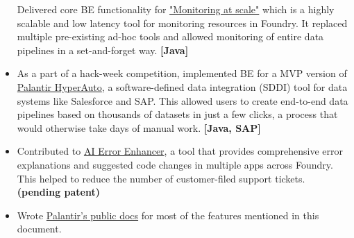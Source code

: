 \begin{itemize}
{        Delivered core BE functionality for
        \href{https://www.palantir.com/docs/foundry/maintaining-pipelines/monitoring-views-intro/}{"Monitoring at scale"}
        which is a highly scalable and low latency tool for monitoring resources in Foundry.
        It replaced multiple pre-existing ad-hoc tools and allowed monitoring of entire data pipelines in a set-and-forget way.
    }
    \textbf{[Java]}
    \item {
        As a part of a hack-week competition, implemented BE for a MVP version of
        \href{https://www.palantir.com/docs/foundry/hyperauto/overview/}{Palantir HyperAuto},
        a software-defined data integration (SDDI) tool for data systems like Salesforce and SAP.
        This allowed users to create end-to-end data pipelines based on thousands of datasets
        in just a few clicks, a process that would otherwise take days of manual work.
    }
    \textbf{[Java, SAP]}
    \item {
        Contributed to
        \href{https://www.palantir.com/docs/foundry/code-repositories/aip-features/#ai-error-enhancer}{AI Error Enhancer},
        a tool that provides comprehensive error explanations and suggested code changes in multiple apps across Foundry.
        This helped to reduce the number of customer-filed support tickets.
    }
    \textbf{(pending patent)}
    \item {
        Wrote
        \href{https://www.palantir.com/docs/foundry/}{Palantir's public docs}
        for most of the features mentioned in this document.
    }
\end{itemize}
